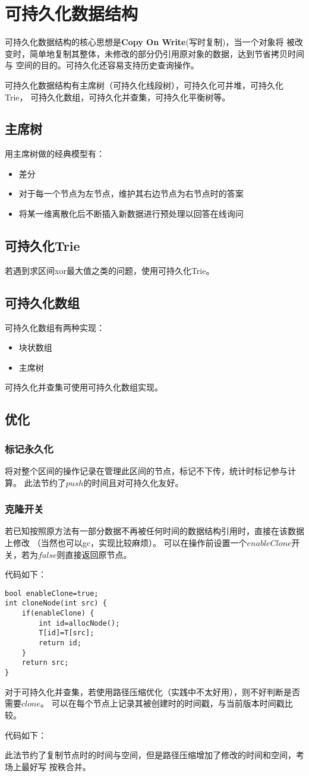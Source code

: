 \section{可持久化数据结构}
可持久化数据结构的核心思想是{\bfseries Copy On Write}(写时复制)，当一个对象将
被改变时，简单地复制其整体，未修改的部分仍引用原对象的数据，达到节省拷贝时间与
空间的目的。可持久化还容易支持历史查询操作。

可持久化数据结构有主席树（可持久化线段树），可持久化可并堆，可持久化Trie，
可持久化数组，可持久化并查集，可持久化平衡树等。
\subsection{主席树}
用主席树做的经典模型有：
\begin{itemize}
    \item 差分
    \item 对于每一个节点为左节点，维护其右边节点为右节点时的答案
    \item 将某一维离散化后不断插入新数据进行预处理以回答在线询问
\end{itemize}
\subsection{可持久化Trie}
若遇到求区间xor最大值之类的问题，使用可持久化Trie。
\subsection{可持久化数组}
可持久化数组有两种实现：
\begin{itemize}
    \item 块状数组
    \item 主席树
\end{itemize}
可持久化并查集可使用可持久化数组实现。
\subsection{优化}
\subsubsection{标记永久化}
将对整个区间的操作记录在管理此区间的节点，标记不下传，统计时标记参与计算。
此法节约了$push$的时间且对可持久化友好。
\subsubsection{克隆开关}
若已知按照原方法有一部分数据不再被任何时间的数据结构引用时，直接在该数据上修改
（当然也可以gc，实现比较麻烦）。
可以在操作前设置一个$enableClone$开关，若为$false$则直接返回原节点。

代码如下：
\begin{lstlisting}[title=cloneA]
bool enableClone=true;
int cloneNode(int src) {
    if(enableClone) {
        int id=allocNode();
        T[id]=T[src];
        return id;
    }
    return src;
}
\end{lstlisting}
对于可持久化并查集，若使用路径压缩优化（实践中不太好用），则不好判断是否需要$clone$。
可以在每个节点上记录其被创建时的时间戳，与当前版本时间戳比较。

代码如下：

此法节约了复制节点时的时间与空间，但是路径压缩增加了修改的时间和空间，考场上最好写
按秩合并。
